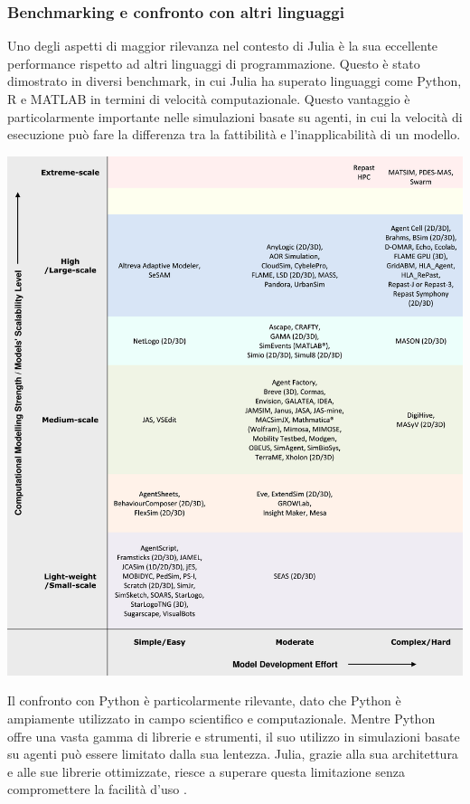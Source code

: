 \subsubsection{Benchmarking e confronto con altri linguaggi}

Uno degli aspetti di maggior rilevanza nel contesto di Julia è la sua 
eccellente performance rispetto ad altri linguaggi di programmazione. 
Questo è stato dimostrato in diversi benchmark, in cui Julia ha superato 
linguaggi come Python, R e MATLAB \cite{ABAR201713} in termini di velocità 
computazionale. Questo vantaggio è particolarmente importante nelle 
simulazioni basate su agenti, in cui la velocità di esecuzione può fare 
la differenza tra la fattibilità e l'inapplicabilità di un modello.

\begin{minipage}{\linewidth}
    \centering
    \includegraphics[width=\textwidth]{img/1-s2.0-S1574013716301198-gr1_lrg.jpg}
    \label{fig:Comparative_table}
\end{minipage}

Il confronto con Python è particolarmente rilevante, dato che Python è 
ampiamente utilizzato in campo scientifico e computazionale. Mentre 
Python offre una vasta gamma di librerie e strumenti, il suo utilizzo 
in simulazioni basate su agenti può essere limitato dalla sua lentezza. 
Julia, grazie alla sua architettura e alle sue librerie ottimizzate, 
riesce a superare questa limitazione senza compromettere la facilità 
d'uso \cite{rackauckas2017differentialequations} 
\cite{rackauckas2019diffeqflux} \cite{rackauckas2020universal} 
\cite{pal2023lux} \cite{Flux.jl-2018} \cite{innes:2018}.

